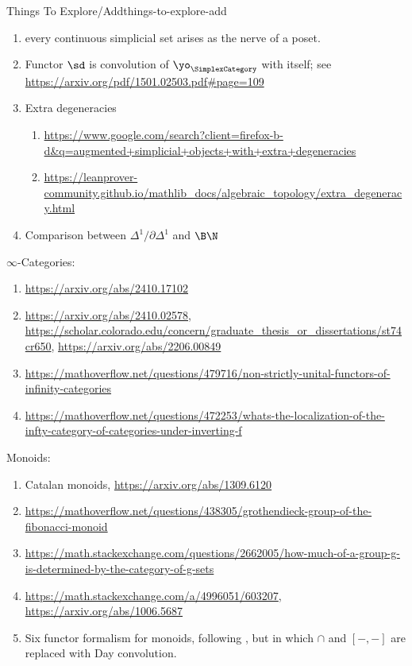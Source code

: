 \begin{remark}{Things To Explore/Add}{things-to-explore-add}
\begin{enumerate}
        \item every continuous simplicial set arises as the nerve of a poset.
        \item Functor $\sd$ is convolution of $\yo_{\SimplexCategory}$ with itself; see \url{https://arxiv.org/pdf/1501.02503.pdf#page=109}
        \item Extra degeneracies
            \begin{enumerate}
                \item \url{https://www.google.com/search?client=firefox-b-d&q=augmented+simplicial+objects+with+extra+degeneracies}
                \item \url{https://leanprover-community.github.io/mathlib_docs/algebraic_topology/extra_degeneracy.html}
            \end{enumerate}
        \item Comparison between $\Delta^{1}/\partial\Delta^{1}$ and $\B\N$
    \end{enumerate}
    $\infty$-Categories:
    \begin{enumerate}
        \item \url{https://arxiv.org/abs/2410.17102}
        \item \url{https://arxiv.org/abs/2410.02578}, \url{https://scholar.colorado.edu/concern/graduate_thesis_or_dissertations/st74cr650}, \url{https://arxiv.org/abs/2206.00849}
        \item \url{https://mathoverflow.net/questions/479716/non-strictly-unital-functors-of-infinity-categories}
        \item \url{https://mathoverflow.net/questions/472253/whats-the-localization-of-the-infty-category-of-categories-under-inverting-f}
    \end{enumerate}
    Monoids:
    \begin{enumerate}
        \item Catalan monoids, \url{https://arxiv.org/abs/1309.6120}
        \item \url{https://mathoverflow.net/questions/438305/grothendieck-group-of-the-fibonacci-monoid}
        \item \url{https://math.stackexchange.com/questions/2662005/how-much-of-a-group-g-is-determined-by-the-category-of-g-sets}
        \item \url{https://math.stackexchange.com/a/4996051/603207}, \url{https://arxiv.org/abs/1006.5687}
        \item Six functor formalism for monoids, following , but in which $\cap$ and $[-,-]$ are replaced with Day convolution.

\end{enumerate}
\end{remark}
